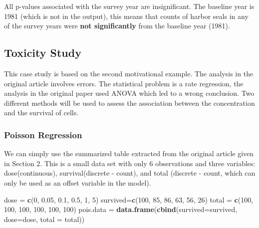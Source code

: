 \documentclass[
]{book}
\newenvironment{Shaded}{\begin{snugshade}}{\end{snugshade}}
\newcommand{\AttributeTok}[1]{\textcolor[rgb]{0.13,0.29,0.53}{#1}}
\newcommand{\DecValTok}[1]{\textcolor[rgb]{0.00,0.00,0.81}{#1}}
\newcommand{\FloatTok}[1]{\textcolor[rgb]{0.00,0.00,0.81}{#1}}
\newcommand{\FunctionTok}[1]{\textcolor[rgb]{0.13,0.29,0.53}{\textbf{#1}}}
\newcommand{\NormalTok}[1]{#1}
\newcommand{\OtherTok}[1]{\textcolor[rgb]{0.56,0.35,0.01}{#1}}
\begin{document}
All p-values associated with the survey year are insignificant. The baseline year is 1981 (which is not in the output), this means that counts of harbor seals in any of the survey years were \textbf{not significantly} from the baseline year (1981).

\hypertarget{toxicity-study}{%
\subsection{Toxicity Study}\label{toxicity-study}}

This case study is based on the second motivational example. The analysis in the original article involves errors. The statistical problem is a rate regression, the analysis in the original paper used ANOVA which led to a wrong conclusion. Two different methods will be used to assess the association between the concentration and the survival of cells.

\hypertarget{poisson-regression}{%
\subsubsection{Poisson Regression}\label{poisson-regression}}

We can simply use the summarized table extracted from the original article given in Section 2. This is a small data set with only 6 observations and three variables: dose(continuous), survival(discrete - count), and total (discrete - count, which can only be used as an offset variable in the model).

\begin{Shaded}
\begin{Highlighting}[]
\NormalTok{dose }\OtherTok{=}   \FunctionTok{c}\NormalTok{(}\DecValTok{0}\NormalTok{, }\FloatTok{0.05}\NormalTok{,  }\FloatTok{0.1}\NormalTok{, }\FloatTok{0.5}\NormalTok{, }\DecValTok{1}\NormalTok{,   }\DecValTok{5}\NormalTok{)}
\NormalTok{survived}\OtherTok{=}\FunctionTok{c}\NormalTok{(}\DecValTok{100}\NormalTok{, }\DecValTok{85}\NormalTok{,  }\DecValTok{86}\NormalTok{,  }\DecValTok{63}\NormalTok{,  }\DecValTok{56}\NormalTok{,  }\DecValTok{26}\NormalTok{)}
\NormalTok{total }\OtherTok{=}  \FunctionTok{c}\NormalTok{(}\DecValTok{100}\NormalTok{, }\DecValTok{100}\NormalTok{, }\DecValTok{100}\NormalTok{, }\DecValTok{100}\NormalTok{, }\DecValTok{100}\NormalTok{, }\DecValTok{100}\NormalTok{)}
\NormalTok{pois.data }\OtherTok{=} \FunctionTok{data.frame}\NormalTok{(}\FunctionTok{cbind}\NormalTok{(}\AttributeTok{survived=}\NormalTok{survived, }\AttributeTok{dose=}\NormalTok{dose, }\AttributeTok{total =}\NormalTok{ total))}
\end{Highlighting}
\end{Shaded}
\end{document}
